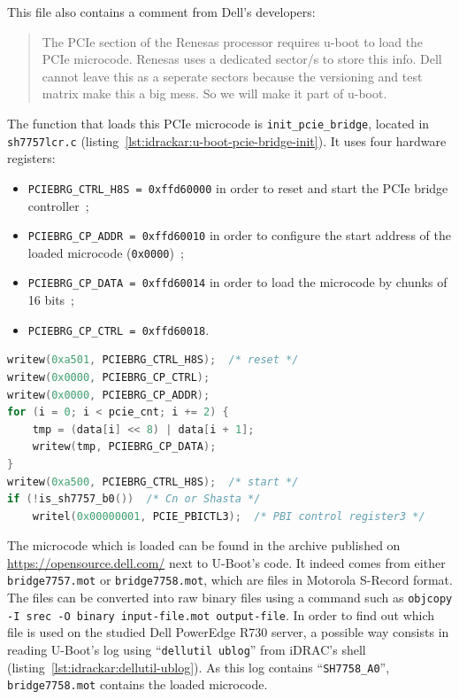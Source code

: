 \noindent
This file also contains a comment from Dell's developers:
\begin{quote}
  \footnotesize
  The PCIe section of the Renesas processor requires u-boot to load the PCIe
  microcode.  Renesas uses a dedicated sector/s to store this info.  Dell
  cannot leave this as a seperate sectors because the versioning and test
  matrix make this a big mess.  So we will make it part of u-boot.
\end{quote}

The function that loads this PCIe microcode is \texttt{init\_pcie\_bridge}, located in \texttt{sh7757lcr.c} (listing~\ref{lst:idrackar:u-boot-pcie-bridge-init}).
It uses four hardware registers:
\begin{itemize}
  \item \texttt{PCIEBRG\_CTRL\_H8S = 0xffd60000} in order to reset and start the PCIe bridge controller~;
  \item \texttt{PCIEBRG\_CP\_ADDR = 0xffd60010} in order to configure the start address of the loaded microcode (\texttt{0x0000})~;
  \item \texttt{PCIEBRG\_CP\_DATA = 0xffd60014} in order to load the microcode by chunks of 16 bits~;
  \item \texttt{PCIEBRG\_CP\_CTRL = 0xffd60018}.
\end{itemize}

{\captionsetup{margin=4.5pt,font=footnotesize,labelfont=bf,labelsep=period}
\begin{lstlisting}[language={C},caption={Extract from U-Boot's \texttt{init\_pcie\_bridge} function, in \texttt{externalsrc/u-boot-idrac8/u-boot\_B0/board/renesas/sh7757lcr/sh7757lcr.c}.},label={lst:idrackar:u-boot-pcie-bridge-init}]
writew(0xa501, PCIEBRG_CTRL_H8S);  /* reset */
writew(0x0000, PCIEBRG_CP_CTRL);
writew(0x0000, PCIEBRG_CP_ADDR);
for (i = 0; i < pcie_cnt; i += 2) {
    tmp = (data[i] << 8) | data[i + 1];
    writew(tmp, PCIEBRG_CP_DATA);
}
writew(0xa500, PCIEBRG_CTRL_H8S);  /* start */
if (!is_sh7757_b0())  /* Cn or Shasta */
    writel(0x00000001, PCIE_PBICTL3);  /* PBI control register3 */
\end{lstlisting}}

The microcode which is loaded can be found in the archive published on \url{https://opensource.dell.com/} next to U-Boot's code.
It indeed comes from either \texttt{bridge7757.mot} or \texttt{bridge7758.mot}, which are files in Motorola S-Record format.
The files can be converted into raw binary files using a command such as \texttt{objcopy -I srec -O binary input-file.mot output-file}.
In order to find out which file is used on the studied Dell PowerEdge R730 server, a possible way consists in reading U-Boot's log using ``\texttt{dellutil ublog}'' from iDRAC's shell  (listing~\ref{lst:idrackar:dellutil-ublog}).
As this log contains ``\texttt{SH7758\_A0}'', \texttt{bridge7758.mot} contains the loaded microcode.

